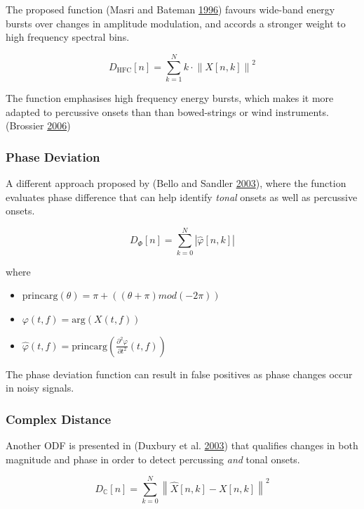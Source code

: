\documentclass[american,]{article}
\providecommand{\tightlist}{%
  \setlength{\itemsep}{0pt}\setlength{\parskip}{0pt}}
\begin{document}
The proposed function (Masri and Bateman \protect\hyperlink{ref-hfc}{1996}) favours wide-band energy bursts
over changes in amplitude modulation, and accords a stronger weight
to high frequency spectral bins.

\[D_{\text{HFC}}[n] = \sum\limits_{k=1}^{N}
    k\cdot\left\lVert X[n,k]\right\rVert^2\]

The function emphasises high frequency energy bursts,
which makes it more adapted to percussive onsets than
than bowed-strings or wind instruments. (Brossier \protect\hyperlink{ref-brossier}{2006})

\hypertarget{phase-deviation}{%
\subsubsection{Phase Deviation}\label{phase-deviation}}

A different approach proposed by (Bello and Sandler \protect\hyperlink{ref-bello}{2003}), where the function
evaluates phase difference that can help identify \emph{tonal}
onsets as well as percussive onsets.

\[D_{\Phi}[n] = \sum\limits_{k=0}^{N}
    \left\lvert \hat{\varphi}[n, k] \right\rvert\]

where

\begin{itemize}
\tightlist
\item
  \(\mathrm{princarg}(\theta) = \pi + ((\theta + \pi) mod (-2\pi))\)
\item
  \(\varphi(t, f) = \mathrm{arg}(X(t, f))\)
\item
  \(\hat{\varphi}(t, f) = \mathrm{princarg} \left( \frac{\partial^2 \varphi}{\partial t^2}(t, f) \right)\)
\end{itemize}

The phase deviation function can result in false positives as
phase changes occur in noisy signals.

\hypertarget{complex-distance}{%
\subsubsection{Complex Distance}\label{complex-distance}}

Another ODF is presented in (Duxbury et al. \protect\hyperlink{ref-duxbury}{2003}) that qualifies changes in both
magnitude and phase in order to detect percussing \emph{and} tonal onsets.

\[D_{\mathbb{C}}[n] = \sum\limits_{k=0}^{N}
    \left\lVert\hat{X}[n, k] - X[n, k]\right\rVert^2\]
\end{document}
